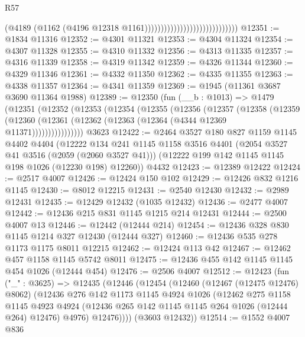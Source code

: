 \begin{lexlean}{R57}
\begin{coremodule}
                                                        (@4189
                                                          (@1162
                                                            (@4196
                                                              @12318
                                                              @1161)))))))))))))))))))))))))))))
@12351 := @1834 @11316
@12352 := @4301 @11321
@12353 := @4304 @11324
@12354 := @4307 @11328
@12355 := @4310 @11332
@12356 := @4313 @11335
@12357 := @4316 @11339
@12358 := @4319 @11342
@12359 := @4326 @11344
@12360 := @4329 @11346
@12361 := @4332 @11350
@12362 := @4335 @11355
@12363 := @4338 @11357
@12364 := @4341 @11359
@12369 := @1945 (@11361 @3687 @3690 @11364 @1988)
@12389 := @12350
    (fun (__b : @1013) =>
    @1479
      (@12351
        (@12352
          (@12353
            (@12354
              (@12355
                (@12356
                  (@12357
                    (@12358
                      (@12359
                        (@12360 (@12361 (@12362 (@12363 (@12364 (@4344 @12369 @11371))))))))))))))))
    @3623
@12422 := @2464
    @3527
    @180
    @827
    @1159
    @1145
    @4402
    @4404
    (@12222
      @134
      @241
      @1145
      @1158
      @3516
      @4401
      (@2054 @3527 @41 @3516 (@2059 (@2060 @3527 @41)))
      (@12222 @199 @142 @1145 @1145 @198 @1026 (@12230 @198) @12260))
    @4432
@12423 := @12389 @12422
@12424 := @2517 @4007
@12426 := @12424 @150 @102
@12429 := @12426 @832 @1216 @1145
@12430 := @8012 @12215
@12431 := @2540 @12430
@12432 := @2989 @12431
@12435 := @12429 @12432 (@1035 @12432)
@12436 := @2477 @4007
@12442 := @12436 @215 @831 @1145 @1215 @214 @12431
@12444 := @2500 @4007 @13
@12446 := @12442 (@12444 @214)
@12454 := @12436 @328 @830 @1145 @1214 @327 @12430 (@12444 @327)
@12460 := @12436 @535 @278 @1173 @1175 @8011 @12215
@12462 := @12424 @113 @42
@12467 := @12462 @457 @1158 @1145 @5742 @8011
@12475 := @12436 @455 @142 @1145 @1145 @454 @1026 (@12444 @454)
@12476 := @2506 @4007
@12512 := @12423
    (fun ("_" : @3625) =>
    @12435
      (@12446
        (@12454
          (@12460
            (@12467 (@12475 @12476) @8062)
            (@12436
              @276
              @142
              @1173
              @1145
              @4924
              @1026
              (@12462
                @275
                @1158
                @1145
                @4923
                @4924
                (@12436 @265 @142 @1145 @1145 @264 @1026 (@12444 @264) @12476)
                @4976)
              @12476))))
      (@3603 @12432))
@12514 := @1552 @4007 @836

\end{coremodule}
\end{lexlean}

